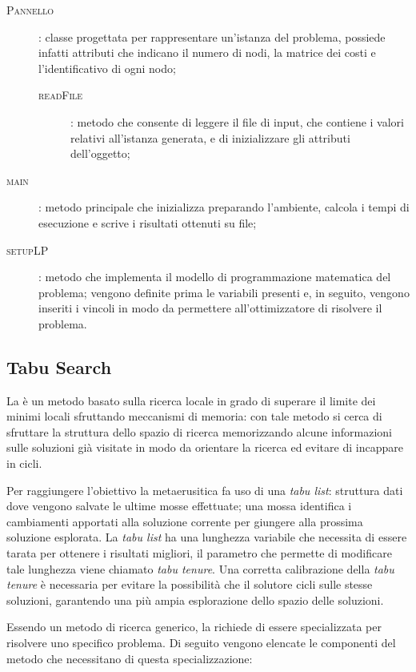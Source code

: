 \begin{description}
	\item[\textsc{Pannello}]: classe progettata per rappresentare un'istanza del problema, possiede infatti attributi che indicano il numero di nodi, la matrice dei costi e l'identificativo di ogni nodo;
	\begin{description}
		\item[\textsc{readFile}]: metodo che consente di leggere il file di input, che contiene i valori relativi all'istanza generata, e di inizializzare gli attributi dell'oggetto;
	\end{description}
	\item[\textsc{main}]: metodo principale che inizializza  preparando l'ambiente, calcola i tempi di esecuzione e scrive i risultati ottenuti su file;
	\item[\textsc{setupLP}]: metodo che implementa il modello di programmazione matematica del problema; vengono definite prima le variabili presenti e, in seguito, vengono inseriti i vincoli in modo da permettere all'ottimizzatore di risolvere il problema.
\end{description}

\subsection{Tabu Search}
La \tabu è un metodo basato sulla ricerca locale in grado di superare il limite dei minimi locali sfruttando meccanismi di memoria: con tale metodo si cerca di sfruttare la struttura dello spazio di ricerca memorizzando alcune informazioni sulle soluzioni già visitate in modo da orientare la ricerca ed evitare di incappare in cicli.

Per raggiungere l'obiettivo la metaerusitica fa uso di una \emph{tabu list}: struttura dati dove vengono salvate le ultime mosse effettuate; una mossa identifica i cambiamenti apportati alla soluzione corrente per giungere alla prossima soluzione esplorata.
La \emph{tabu list} ha una lunghezza variabile che necessita di essere tarata per ottenere i risultati migliori, il parametro che permette di modificare tale lunghezza viene chiamato \emph{tabu tenure}.
Una corretta calibrazione della \emph{tabu tenure} è necessaria per evitare la possibilità che il solutore cicli sulle stesse soluzioni, garantendo una più ampia esplorazione dello spazio delle soluzioni.

Essendo un metodo di ricerca generico, la \tabu richiede di essere specializzata per risolvere uno specifico problema.
Di seguito vengono elencate le componenti del metodo che necessitano di questa specializzazione:

